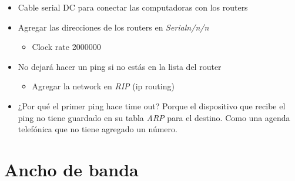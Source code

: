 \documentclass[11pt]{article}
\author{Diego Domínguez}
\date{\today}
\title{}
\begin{document}
\begin{itemize}
\item Cable serial DC para conectar las computadoras
con los routers
\item Agregar las direcciones de los routers en \emph{Serialn/n/n}
\begin{itemize}
\item Clock rate 2000000
\end{itemize}
\item No dejará hacer un ping si no estás en la lista
del router
\begin{itemize}
\item Agregar la network en \emph{RIP} (ip routing)
\end{itemize}

\item ¿Por qué el primer ping hace time out?
Porque el dispositivo que recibe el ping no
tiene guardado en su tabla \emph{ARP} para el
destino.
Como una agenda telefónica que no tiene agregado
un número.
\end{itemize}

\section{Ancho de banda}
\label{sec:org3c4e6ae}
\end{document}
